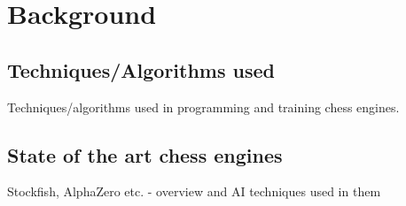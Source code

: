 \chapter{Background}
\label{chap:ch2}

\section{Techniques/Algorithms used}
\label{sec:ch2sec1}

\par Techniques/algorithms used in programming and training chess engines.

\section{State of the art chess engines}
\label{sec:ch2sec2}

\par Stockfish, AlphaZero etc. - overview and AI techniques used in them 
